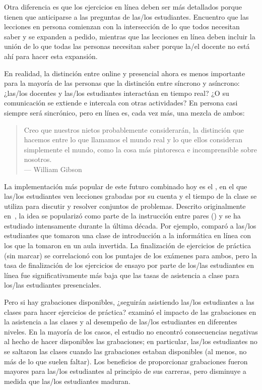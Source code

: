 Otra diferencia es que
los ejercicios en línea deben ser más detallados
porque tienen que anticiparse a las preguntas de las/los estudiantes.
Encuentro que las lecciones en persona comienzan con la intersección de lo que todos necesitan saber y se expanden a pedido,
mientras que las lecciones en línea deben incluir la unión de lo que todas las personas necesitan saber
porque la/el docente no está ahí para hacer esta expansión.

En realidad,
la distinción entre online y presencial ahora es menos importante para la mayoría de las personas
que la distinción entre síncrono y asíncrono:
¿las/los docentes y las/los estudiantes interactúan en tiempo real?
¿O su comunicación se extiende e intercala con otras actividades?
En persona casi siempre será sincrónico,
pero en línea es, cada vez más, una mezcla de ambos:

\begin{quote}

  Creo que nuestros nietos probablemente considerarán, la distinción que hacemos
  entre lo que llamamos el mundo real y lo que ellos consideran simplemente el mundo,
  como la cosa más pintoresca e incomprensible sobre nosotros. \\
  --- William Gibson

\end{quote}

La implementación más popular de este futuro combinado hoy
es el ,
en el que las/los estudiantes ven lecciones grabadas por su cuenta
y el tiempo de la clase se utiliza para discutir y resolver conjuntos de problemas.
Descrito originalmente en~\cite{King1993},
la idea se popularizó como parte de la instrucción entre pares ()
y se ha estudiado intensamente durante la última década.
Por ejemplo,
\cite{Camp2016} comparó a las/los estudiantes que tomaron una clase de introducción a la informática en línea
con los que la tomaron en un aula invertida.
La finalización de ejercicios de práctica (sin marcar) se correlacionó con los puntajes de los exámenes para ambos,
pero la tasa de finalización de los ejercicios de ensayo por parte de los/las estudiantes en línea
fue significativamente más baja que las tasas de asistencia a clase para los/las estudiantes presenciales.

Pero si hay grabaciones disponibles,
¿seguirán asistiendo las/los estudiantes a las clases para hacer ejercicios de práctica?
\cite{Nord2017} examinó el impacto de las grabaciones en la asistencia a las clases
y al desempeño de las/los estudiantes en diferentes niveles.
En la mayoría de los casos, el estudio no encontró consecuencias negativas al hecho de hacer disponibles las grabaciones;
en particular,
las/los estudiantes no se saltaron las clases cuando las grabaciones estaban disponibles
(al menos, no más de lo que suelen faltar).
Los beneficios de proporcionar grabaciones fueron mayores para las/los estudiantes al principio de sus carreras,
pero disminuye a medida que las/los estudiantes maduran.

